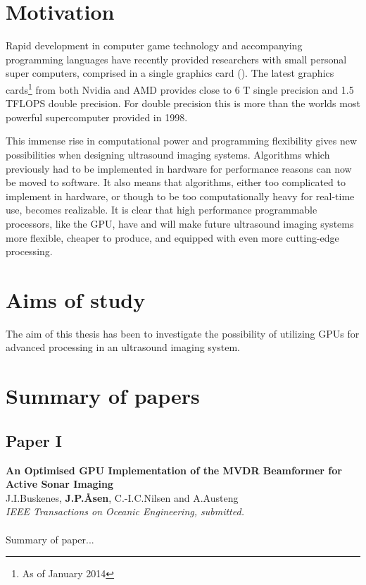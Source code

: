 \section{Motivation}
Rapid development in computer game technology and accompanying programming languages have recently provided researchers with small personal super computers, comprised in a single graphics card (). The latest graphics cards\footnote{As of January 2014} from both Nvidia and AMD provides close to 6 T single precision and 1.5 TFLOPS double precision. For double precision this is more than the worlds most powerful supercomputer provided in 1998.

This immense rise in computational power and programming flexibility gives new possibilities when designing ultrasound imaging systems. Algorithms which previously had to be implemented in hardware for performance reasons can now be moved to software. It also means that algorithms, either too complicated to implement in hardware, or though to be too computationally heavy for real-time use, becomes realizable. It is clear that high performance programmable processors, like the GPU, have and will make future ultrasound imaging systems more flexible, cheaper to produce, and equipped with even more cutting-edge processing.

\section{Aims of study}
The aim of this thesis has been to investigate the possibility of utilizing GPUs for advanced processing in an ultrasound imaging system. 



\section{Summary of papers}

\subsection{Paper I}
\textbf{An Optimised GPU Implementation of the MVDR Beamformer for Active Sonar Imaging}\\
J.\:I.\:Buskenes, \textbf{J.\:P.\:\AA{}sen}, C.-I.\:C.\:Nilsen and A.\:Austeng\\
{\it IEEE Transactions on Oceanic Engineering, submitted.}\\\\
Summary of paper...

